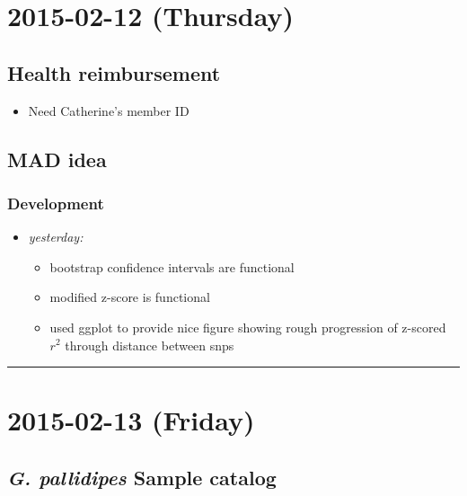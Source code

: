\documentclass[letterpaper]{scrartcl}
\begin{document}
\section{2015-02-12 (Thursday)}\label{thursday-1}

\subsection{Health reimbursement}\label{health-reimbursement-2}

\begin{itemize}
\itemsep1pt\parskip0pt
\item
  Need Catherine's member ID
\end{itemize}

\subsection{MAD idea}\label{mad-idea-2}

\subsubsection{Development}\label{development-2}

\begin{itemize}
\itemsep1pt\parskip0pt
\item
  \emph{yesterday:}

  \begin{itemize}
  \itemsep1pt\parskip0pt
  \item
    bootstrap confidence intervals are functional
  \item
    modified z-score is functional
  \item
    used ggplot to provide nice figure showing rough progression of
    z-scored \(r^2\) through distance between snps
  \end{itemize}
\end{itemize}

\begin{center}\rule{0.5\linewidth}{\linethickness}\end{center}

\section{2015-02-13 (Friday)}\label{friday-1}

\subsection{\emph{G. pallidipes} Sample
catalog}\label{g.-pallidipes-sample-catalog}
\end{document}
